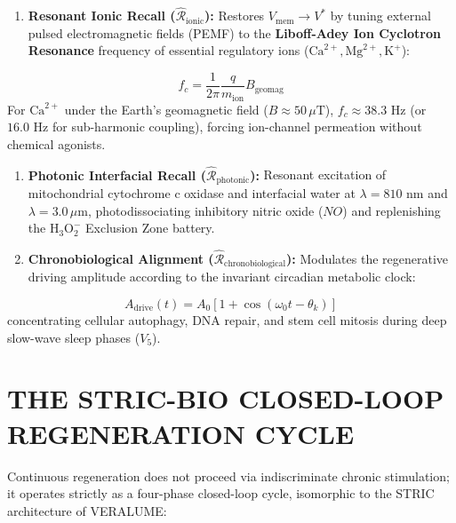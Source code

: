 \documentclass[10pt,twocolumn]{article}
\begin{document}
\begin{enumerate}
  \item \textbf{Resonant Ionic Recall ($\hat{\mathcal{R}}_{\text{ionic}}$):} Restores $V_{\text{mem}} \to V^*$ by tuning external pulsed electromagnetic fields (PEMF) to the \textbf{Liboff-Adey Ion Cyclotron Resonance} frequency of essential regulatory ions ($\text{Ca}^{2+}, \text{Mg}^{2+}, \text{K}^+$):
\end{enumerate}
\begin{equation}
  f_c = \frac{1}{2\pi} \frac{q}{m_{\text{ion}}} B_{\text{geomag}}
\end{equation}
   For $\text{Ca}^{2+}$ under the Earth's geomagnetic field ($B \approx 50\,\mu\text{T}$), $f_c \approx 38.3\text{ Hz}$ (or $16.0\text{ Hz}$ for sub-harmonic coupling), forcing ion-channel permeation without chemical agonists.
\begin{enumerate}
  \item \textbf{Photonic Interfacial Recall ($\hat{\mathcal{R}}_{\text{photonic}}$):} Resonant excitation of mitochondrial cytochrome c oxidase and interfacial water at $\lambda = 810\text{ nm}$ and $\lambda = 3.0\,\mu\text{m}$, photodissociating inhibitory nitric oxide ($NO$) and replenishing the $\text{H}_3\text{O}_2^-$ Exclusion Zone battery.
  \item \textbf{Chronobiological Alignment ($\hat{\mathcal{R}}_{\text{chronobiological}}$):} Modulates the regenerative driving amplitude according to the invariant circadian metabolic clock:
\end{enumerate}
\begin{equation}
  A_{\text{drive}}(t) = A_0 \left[ 1 + \cos(\omega_0 t - \theta_k) \right]
\end{equation}
   concentrating cellular autophagy, DNA repair, and stem cell mitosis during deep slow-wave sleep phases ($V_5$).



\section{THE STRIC-BIO CLOSED-LOOP REGENERATION CYCLE}

Continuous regeneration does not proceed via indiscriminate chronic stimulation; it operates strictly as a four-phase closed-loop cycle, isomorphic to the STRIC architecture of VERALUME:
\end{document}
